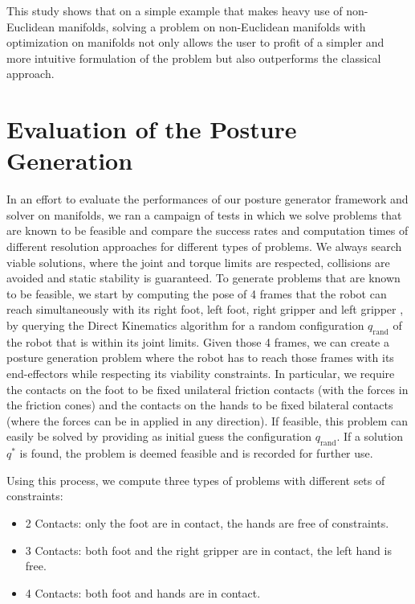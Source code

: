 This study shows that on a simple example that makes heavy use of non-Euclidean manifolds, solving a problem on non-Euclidean manifolds with optimization on manifolds not only allows the user to profit of a simpler and more intuitive formulation of the problem but also outperforms the classical approach.


\section{Evaluation of the Posture Generation}
\label{sec:evaluation_of_the_posture_generation}

In an effort to evaluate the performances of our posture generator framework and solver on manifolds, we ran a campaign of tests in which we solve problems that are known to be feasible and compare the success rates and computation times of different resolution approaches for different types of problems.
We always search viable solutions, where the joint and torque limits are respected, collisions are avoided and static stability is guaranteed.
To generate problems that are known to be feasible, we start by computing the pose of 4 frames that the robot can reach simultaneously with its right foot, left foot, right gripper and left gripper%
, by querying the Direct Kinematics algorithm for a random configuration $q_\text{rand}$ of the robot that is within its joint limits.
Given those 4 frames, we can create a posture generation problem where the robot has to reach those frames with its end-effectors while respecting its viability constraints.
In particular, we require the contacts on the foot to be fixed unilateral friction contacts (with the forces in the friction cones) and the contacts on the hands to be fixed bilateral contacts (where the forces can be in applied in any direction).
If feasible, this problem can easily be solved by providing as initial guess the configuration $q_\text{rand}$.
If a solution $q^*$ is found, the problem is deemed feasible and is recorded for further use.

Using this process, we compute three types of problems with different sets of constraints:
\begin{itemize}
  \item 2 Contacts: only the foot are in contact, the hands are free of constraints.
  \item 3 Contacts: both foot and the right gripper are in contact, the left hand is free.
  \item 4 Contacts: both foot and hands are in contact.
\end{itemize}

